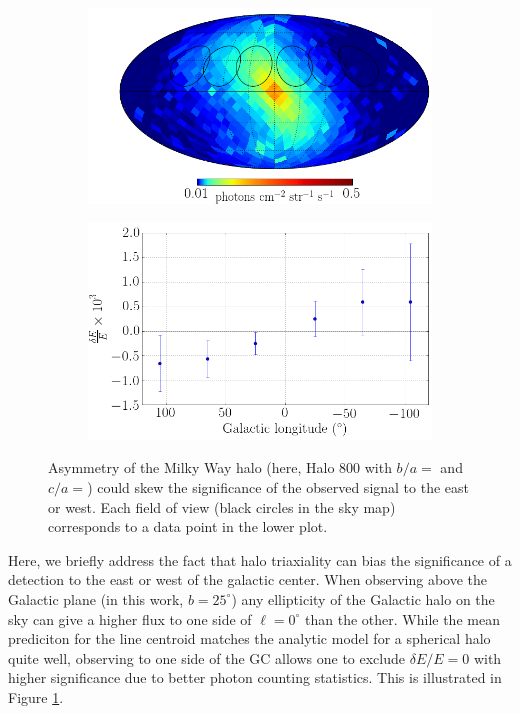 \documentclass[aps,prl,10pt,twocolumn,superscriptaddress,showpacs]{revtex4-1}
\begin{document}
\begin{figure}[h!]
\centering
\begin{subfigure}[b]{1.0\columnwidth}
	\includegraphics[width=\textwidth]{flux_map_800.png}
\end{subfigure}
\par\medskip
\begin{subfigure}[b]{1.0\columnwidth}
	\includegraphics[width=\textwidth]{de_vs_l_800.png}
\end{subfigure}
\caption{Asymmetry of the Milky Way halo (here, Halo 800 with $b/a=$ and $c/a=$) could skew the significance of the
	observed signal to the east or west. Each field of view (black circles in the sky map) corresponds to a data point in
the lower plot.}
\label{fig:triax}
\end{figure}


Here, we briefly address the fact that halo triaxiality can bias the significance of a detection to
the east or west of the galactic center. When observing above the Galactic plane (in this work,
$b=25^\circ$) any ellipticity of the Galactic halo on the sky can give a higher flux to one side of
$\ell=0^\circ$ than the other. While the mean prediciton for the line centroid matches the analytic model
for a spherical halo quite well, observing to one side of the GC allows one to exclude $\delta
E/E=0$ with higher significance due to better photon counting statistics. This is illustrated in Figure \ref{fig:triax}.
\end{document}
